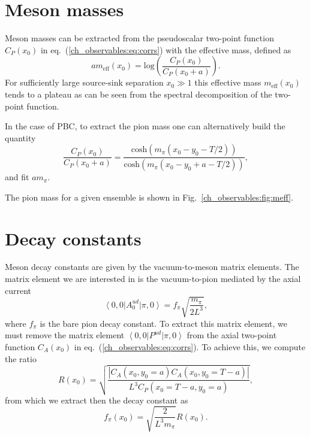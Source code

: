 
\section{Meson masses}
\label{ch_observables:sec:meson_mass}

Meson masses can be extracted from the pseudoscalar two-point function $C_P(x_0)$ in eq.~(\ref{ch_observables:eq:corrs}) with the effective mass, defined as
\begin{equation}
\label{ch_observables:eq:meff}
am_{\textrm{eff}}(x_0)={\textrm{log}}\left(\frac{C_P(x_0)}{C_P(x_0+a)}\right).
\end{equation}
For sufficiently large source-sink separation $x_0\gg 1$ this effective mass $m_{\textrm{eff}}(x_0)$ tends to a plateau as can be seen from the spectral decomposition of the two-point function. 

In the case of PBC, to extract the pion mass one can alternatively build the quantity
\begin{equation}
\label{ch_observables:eq:meff_PBC}
\frac{C_P(x_0)}{C_P(x_0+a)}=\frac{{\textrm{cosh}}(m_{\pi}(x_0-y_0-T/2))}{{\textrm{cosh}}(m_{\pi}(x_0-y_0+a-T/2))},
\end{equation}
and fit $am_{\pi}$.

The pion mass for a given ensemble is shown in Fig.~\ref{ch_observables:fig:meff}.


\section{Decay constants}
\label{ch_observables:sec:dec_const}

Meson decay constants are given by the vacuum-to-meson matrix elements. The matrix element we are interested in is the vacuum-to-pion mediated by the axial current
\begin{equation}
\label{ch_observables:eq:axial_matrix_element}
\left<0,0\right|A_0^{ud}\left|\pi,0\right>=f_{\pi}\sqrt{\frac{m_{\pi}}{2L^3}},
\end{equation}
where $f_{\pi}$ is the bare pion decay constant. To extract this matrix element, we must remove the matrix element $\left<0,0\right|P^{ud}\left|\pi,0\right>$ from the axial two-point function $C_A(x_0)$ in eq.~(\ref{ch_observables:eq:corrs}). To achieve this, we compute the ratio
\begin{equation}
\label{ch_observables:eq:R}
R(x_0)=\sqrt{\frac{\left|C_A(x_0,y_0=a)C_A(x_0,y_0=T-a)\right|}{L^3C_P(x_0=T-a,y_0=a)}},
\end{equation}
from which we extract then the decay constant as
\begin{equation}
f_{\pi}(x_0)=\sqrt{\frac{2}{L^3m_{\pi}}}R(x_0).
\end{equation}

